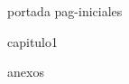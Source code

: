 \documentclass[a4paper,12pt,oneside]{book}
\begin{document}
{portada}
{pag-iniciales}
	
{capitulo1}

\printbibliography

{anexos}
\end{document}
